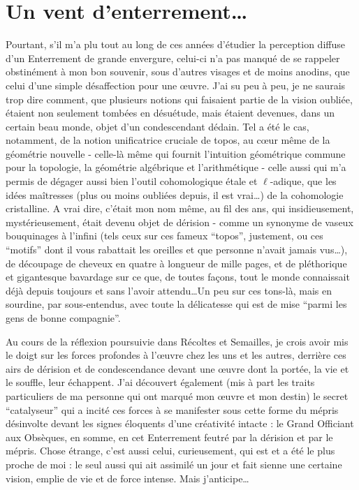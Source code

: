 \section{Un vent d'enterrement\ldots}

Pourtant, s'il m'a plu tout au long de ces années d'étudier la perception diffuse d'un Enterrement de grande envergure, celui-ci n'a pas manqué de se rappeler obstinément à mon bon souvenir, sous d'autres visages et de moins anodins, que celui d'une simple désaffection pour une œuvre. J'ai su peu à peu, je ne saurais trop dire comment, que plusieurs notions qui faisaient partie de la vision oubliée, étaient non seulement tombées en désuétude, mais étaient devenues, dans un certain beau monde, objet d'un condescendant dédain. Tel a été le cas, notamment, de la notion unificatrice cruciale de topos, au cœur même de la géométrie nouvelle - celle-là même qui fournit l'intuition géométrique commune pour la topologie, la géométrie algébrique et l'arithmétique - celle aussi qui m'a permis de dégager aussi bien l'outil cohomologique étale et $\ell$-adique, que les idées maîtresses (plus ou moins oubliées depuis, il est vrai\ldots) de la cohomologie cristalline. A vrai dire, c'était mon nom même, au fil des ans, qui insidieusement, mystérieusement, était devenu objet de dérision - comme un synonyme de vaseux bouquinages à l'infini (tels ceux sur ces fameux ``topos'', justement, ou ces ``motifs'' dont il vous rabattait les oreilles et que personne n'avait jamais vus\ldots), de découpage de cheveux en quatre à longueur de mille pages, et de pléthorique et gigantesque bavardage sur ce que, de toutes façons, tout le monde connaissait déjà depuis toujours et sans l'avoir attendu\ldots Un peu sur ces tons-là, mais en sourdine, par sous-entendus, avec toute la délicatesse qui est de mise ``parmi les gens de bonne compagnie''.

Au cours de la réflexion poursuivie dans Récoltes et Semailles, je crois avoir mis le doigt sur les forces profondes à l'œuvre chez les uns et les autres, derrière ces airs de dérision et de condescendance devant une œuvre dont la portée, la vie et le souffle, leur échappent. J'ai découvert également (mis à part les traits particuliers de ma personne qui ont marqué mon œuvre et mon destin) le secret ``catalyseur'' qui a incité ces forces à se manifester sous cette forme du mépris désinvolte devant les signes éloquents d'une créativité intacte : le Grand Officiant aux Obsèques, en somme, en cet Enterrement feutré par la dérision et par le mépris. Chose étrange, c'est aussi celui, curieusement, qui est et a été le plus proche de moi : le seul aussi qui ait assimilé un jour et fait sienne une certaine vision, emplie de vie et de force intense. Mais j'anticipe\ldots

